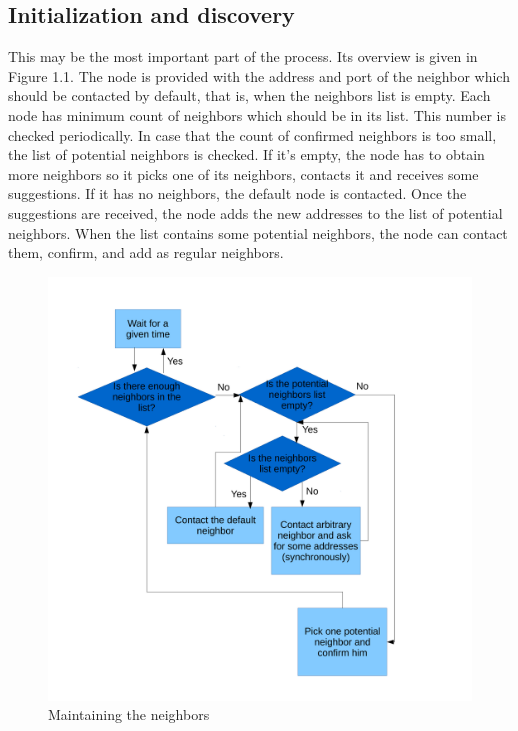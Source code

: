 \subsection*{Initialization and discovery}

This may be the most important part of the process. Its overview is
given in Figure 1.1. The node is provided with the address and port of
the neighbor which should be contacted by default, that is, when the
neighbors list is empty. Each node has minimum count of neighbors which
should be in its list. This number is checked periodically. In case that
the count of confirmed neighbors is too small, the list of potential
neighbors is checked. If it's empty, the node has to obtain more
neighbors so it picks one of its neighbors, contacts it and receives
some suggestions. If it has no neighbors, the default node is contacted.
Once the suggestions are received, the node adds the new addresses to
the list of potential neighbors. When the list contains some potential
neighbors, the node can contact them, confirm, and add as regular
neighbors.

\begin{figure}[h]
\begin{center}
\includegraphics[scale=0.40]{./img/workflow_neighbors.pdf}
\caption{Maintaining the neighbors}
\end{center}
\end{figure}

